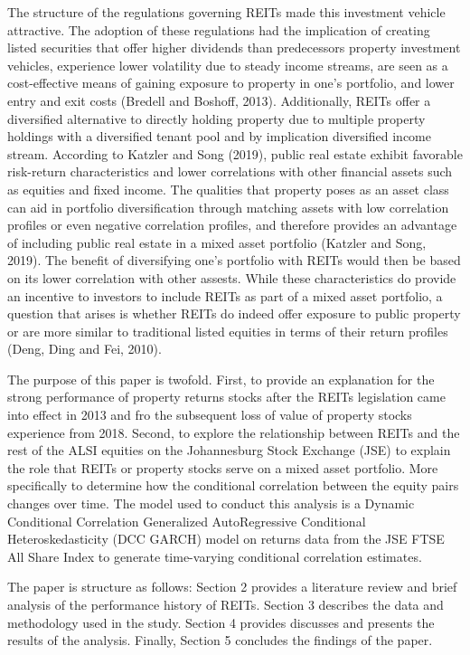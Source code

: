 \documentclass[11pt,preprint, authoryear]{elsarticle}
\numberwithin{equation}{section}
\numberwithin{figure}{section}
\numberwithin{table}{section}
\begin{document}
The structure of the regulations governing REITs made this investment
vehicle attractive. The adoption of these regulations had the
implication of creating listed securities that offer higher dividends
than predecessors property investment vehicles, experience lower
volatility due to steady income streams, are seen as a cost-effective
means of gaining exposure to property in one's portfolio, and lower
entry and exit costs (Bredell and Boshoff, 2013). Additionally, REITs
offer a diversified alternative to directly holding property due to
multiple property holdings with a diversified tenant pool and by
implication diversified income stream. According to Katzler and Song
(2019), public real estate exhibit favorable risk-return characteristics
and lower correlations with other financial assets such as equities and
fixed income. The qualities that property poses as an asset class can
aid in portfolio diversification through matching assets with low
correlation profiles or even negative correlation profiles, and
therefore provides an advantage of including public real estate in a
mixed asset portfolio (Katzler and Song, 2019). The benefit of
diversifying one's portfolio with REITs would then be based on its lower
correlation with other assests. While these characteristics do provide
an incentive to investors to include REITs as part of a mixed asset
portfolio, a question that arises is whether REITs do indeed offer
exposure to public property or are more similar to traditional listed
equities in terms of their return profiles (Deng, Ding and Fei, 2010).

The purpose of this paper is twofold. First, to provide an explanation
for the strong performance of property returns stocks after the REITs
legislation came into effect in 2013 and fro the subsequent loss of
value of property stocks experience from 2018. Second, to explore the
relationship between REITs and the rest of the ALSI equities on the
Johannesburg Stock Exchange (JSE) to explain the role that REITs or
property stocks serve on a mixed asset portfolio. More specifically to
determine how the conditional correlation between the equity pairs
changes over time. The model used to conduct this analysis is a Dynamic
Conditional Correlation Generalized AutoRegressive Conditional
Heteroskedasticity (DCC GARCH) model on returns data from the JSE FTSE
All Share Index to generate time-varying conditional correlation
estimates.

The paper is structure as follows: Section 2 provides a literature
review and brief analysis of the performance history of REITs. Section 3
describes the data and methodology used in the study. Section 4 provides
discusses and presents the results of the analysis. Finally, Section 5
concludes the findings of the paper.
\end{document}
